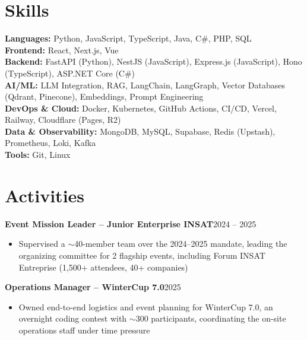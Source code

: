 \documentclass[10pt,a4paper]{article}
\newcommand{\entry}[2]{\vspace{1pt}\noindent\textbf{#1}\hfill{\color{muted}#2}\par}
\begin{document}
\section{Skills}
\textbf{Languages:} Python, JavaScript, TypeScript, Java, C\#, PHP, SQL\\
\textbf{Frontend:} React, Next.js, Vue\\
\textbf{Backend:} FastAPI (Python), NestJS (JavaScript), Express.js (JavaScript), Hono (TypeScript), ASP.NET Core (C\#)\\
\textbf{AI/ML:} LLM Integration, RAG, LangChain, LangGraph, Vector Databases (Qdrant, Pinecone), Embeddings, Prompt Engineering\\
\textbf{DevOps \& Cloud:} Docker, Kubernetes, GitHub Actions, CI/CD, Vercel, Railway, Cloudflare (Pages, R2)\\
\textbf{Data \& Observability:} MongoDB, MySQL, Supabase, Redis (Upstash), Prometheus, Loki, Kafka\\
\textbf{Tools:} Git, Linux

\section{Activities}
\entry{Event Mission Leader -- Junior Enterprise INSAT}{2024 -- 2025}
\begin{itemize}
  \item Supervised a $\sim$40-member team over the 2024--2025 mandate, leading the organizing committee for 2 flagship events, including Forum INSAT Entreprise (1,500+ attendees, 40+ companies)
\end{itemize}
\entry{Operations Manager -- WinterCup 7.0}{2025}
\begin{itemize}
  \item Owned end-to-end logistics and event planning for WinterCup 7.0, an overnight coding contest with $\sim$300 participants, coordinating the on-site operations staff under time pressure
\end{itemize}
\end{document}
